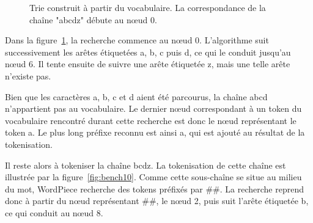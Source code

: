 \documentclass[12pt,a4paper]{report}
\begin{document}
\begin{figure}[H]
	\caption{Trie construit à partir du vocabulaire. La correspondance de la chaîne "abcdz" débute au nœud 0.}
	\label{fig:bench9}
	\end{figure}
	\FloatBarrier
	
	Dans la figure~\ref{fig:bench9}, la recherche commence au nœud 0. L'algorithme suit successivement les arêtes étiquetées a, b, c puis d, ce qui le conduit jusqu'au nœud 6. Il tente ensuite de suivre une arête étiquetée z, mais une telle arête n'existe pas.
	
	Bien que les caractères a, b, c et d aient été parcourus, la chaîne abcd n'appartient pas au vocabulaire. Le dernier nœud correspondant à un token du vocabulaire rencontré durant cette recherche est donc le nœud représentant le token a. Le plus long préfixe reconnu est ainsi a, qui est ajouté au résultat de la tokenisation.
	
	Il reste alors à tokeniser la chaîne bcdz. La tokenisation de cette chaîne est illustrée par la figure~\ref{fig:bench10}. Comme cette sous-chaîne se situe au milieu du mot, WordPiece recherche des tokens préfixés par \#\#. La recherche reprend donc à partir du nœud représentant \#\#, le nœud 2, puis suit l'arête étiquetée b, ce qui conduit au nœud 8.
	
\end{document}
